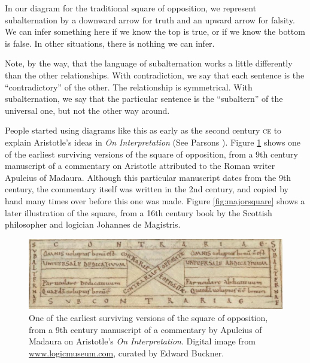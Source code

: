 In our diagram for the traditional square of opposition, we represent subalternation by a downward arrow for truth and an upward arrow for falsity. We can infer something here if we know the top is true, or if we know the bottom is false. In other situations, there is nothing we can infer. 

Note, by the way, that the language of subalternation works a little differently than the other relationships. With contradiction, we say that each sentence is the ``contradictory'' of the other. The relationship is symmetrical. With subalternation, we say that the particular sentence is the ``subaltern'' of the universal one, but not the other way around.  

People started using diagrams like this as early as the second century \textsc{ce} to explain Aristotle's ideas in \textit{On Interpretation} (See Parsons \citeyear{Parsons1997}). Figure \ref{fig:apuleiussquare} shows one of the earliest surviving versions of the square of opposition, from a 9th century manuscript of a commentary on Aristotle attributed to the Roman writer Apuleius of Madaura. Although this particular manuscript dates from the 9th century, the commentary itself was written in the 2nd century, and copied by hand many times over before this one was made. Figure \ref{fig:majorsquare} shows a later illustration of the square, from a 16th century book by the Scottish philosopher and logician Johannes de Magistris.

\begin{figure}
\begin{mdframed}[style=mytableclearbox]
\begin{center}
\includegraphics*{img/apuleiussquare}
\end{center}
\end{mdframed}
\caption{One of the earliest surviving versions of the square of opposition, from a 9th century manuscript of a commentary by Apuleius of Madaura on Aristotle's \textit{On Interpretation}. Digital image from \protect\url{www.logicmuseum.com}, curated by Edward Buckner.}
\label{fig:apuleiussquare}
\end{figure}


